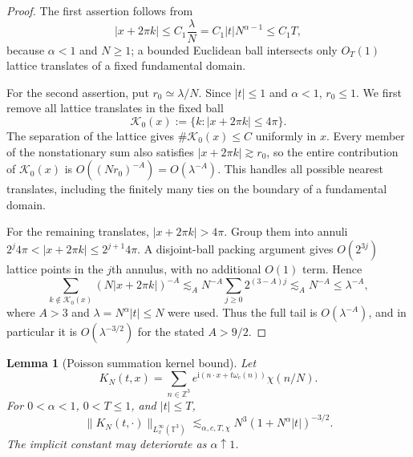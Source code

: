 \documentclass[10pt]{amsart}
\numberwithin{equation}{section}
\theoremstyle{plain}
\newtheorem{lemma}[theorem]{Lemma}
\theoremstyle{definition}
\theoremstyle{remark}
\newcommand{\ii}{\mathrm{i}}
\begin{document}
\begin{proof}
The first assertion follows from
\[
  |x+2\pi k|\le C_1\frac{\lambda}{N}
   =C_1|t|N^{\alpha-1}\le C_1T,
\]
because $\alpha<1$ and $N\ge1$; a bounded Euclidean ball intersects only $O_T(1)$ lattice translates of a fixed fundamental domain.

For the second assertion, put $r_0\simeq\lambda/N$.  Since $|t|\le1$ and $\alpha<1$, $r_0\le1$.  We first remove all lattice translates in the fixed ball
\[
        \mathcal K_0(x):=\{k:|x+2\pi k|\le4\pi\}.
\]
The separation of the lattice gives $\#\mathcal K_0(x)\le C$ uniformly in $x$.  Every member of the nonstationary sum also satisfies $|x+2\pi k|\gtrsim r_0$, so the entire contribution of $\mathcal K_0(x)$ is $O((Nr_0)^{-A})=O(\lambda^{-A})$.  This handles all possible nearest translates, including the finitely many ties on the boundary of a fundamental domain.

For the remaining translates, $|x+2\pi k|>4\pi$.  Group them into annuli $2^j4\pi<|x+2\pi k|\le2^{j+1}4\pi$.  A disjoint-ball packing argument gives $O(2^{3j})$ lattice points in the $j$th annulus, with no additional $O(1)$ term.  Hence
\[
  \sum_{k\notin\mathcal K_0(x)}(N|x+2\pi k|)^{-A}
  \lesssim_A N^{-A}\sum_{j\ge0}2^{(3-A)j}
  \lesssim_A N^{-A}
  \le \lambda^{-A},
\]
where $A>3$ and $\lambda=N^\alpha|t|\le N$ were used.  Thus the full tail is $O(\lambda^{-A})$, and in particular it is $O(\lambda^{-3/2})$ for the stated $A>9/2$.
\end{proof}

\begin{lemma}[Poisson summation kernel bound]\label{lem:fracKG-poisson-kernel}
Let
\[
        K_N(t,x)=\sum_{n\in\mathbb Z^3}e^{\ii(n\cdot x+t\omega_c(n))}\chi(n/N).
\]
For $0<\alpha<1$, $0<T\le1$, and $|t|\le T$,
\begin{equation}\label{eq:fracKG-kernel}
        \|K_N(t,\cdot)\|_{L_x^\infty(\mathbb T^3)}
        \lesssim_{\alpha,c,T,\chi}
        N^3(1+N^\alpha|t|)^{-3/2}.
\end{equation}
The implicit constant may deteriorate as $\alpha\uparrow 1$.
\end{lemma}
\end{document}
